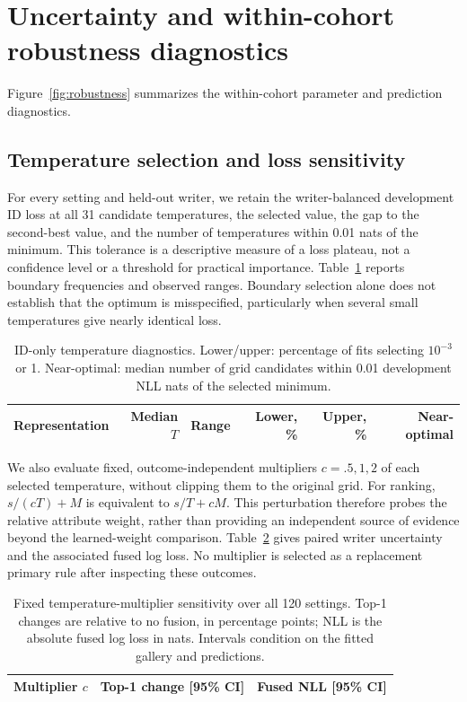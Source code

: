 \documentclass[10pt,a4paper]{article}
\begin{document}
\section{Uncertainty and within-cohort robustness diagnostics}
\label{sec:suprobust}
Figure~\ref{fig:robustness} summarizes the within-cohort parameter and prediction diagnostics.
\subsection{Temperature selection and loss sensitivity}
For every setting and held-out writer, we retain the writer-balanced development ID loss at all 31 candidate temperatures, the selected value, the gap to the second-best value, and the number of temperatures within 0.01 nats of the minimum. This tolerance is a descriptive measure of a loss plateau, not a confidence level or a threshold for practical importance. Table~\ref{tab:tempdiag} reports boundary frequencies and observed ranges. Boundary selection alone does not establish that the optimum is misspecified, particularly when several small temperatures give nearly identical loss.

\begin{table}[ht]
\centering\small
\caption{ID-only temperature diagnostics. Lower/upper: percentage of fits selecting $10^{-3}$ or 1. Near-optimal: median number of grid candidates within 0.01 development NLL nats of the selected minimum.}\label{tab:tempdiag}
\begin{tabular}{lrrrrr}\toprule
Representation & Median $T$ & Range & Lower, \% & Upper, \% & Near-optimal\\\midrule

\end{tabular}
\end{table}

We also evaluate fixed, outcome-independent multipliers $c=.5,1,2$ of each selected temperature, without clipping them to the original grid. For ranking, $s/(cT)+M$ is equivalent to $s/T+cM$. This perturbation therefore probes the relative attribute weight, rather than providing an independent source of evidence beyond the learned-weight comparison. Table~\ref{tab:tempsensitivity} gives paired writer uncertainty and the associated fused log loss. No multiplier is selected as a replacement primary rule after inspecting these outcomes.

\begin{table}[ht]
\centering\small
\caption{Fixed temperature-multiplier sensitivity over all 120 settings. Top-1 changes are relative to no fusion, in percentage points; NLL is the absolute fused log loss in nats. Intervals condition on the fitted gallery and predictions.}\label{tab:tempsensitivity}
\begin{tabular}{rrr}\toprule
Multiplier $c$ & Top-1 change [95\% CI] & Fused NLL [95\% CI]\\\midrule

\end{tabular}
\end{table}
\end{document}
